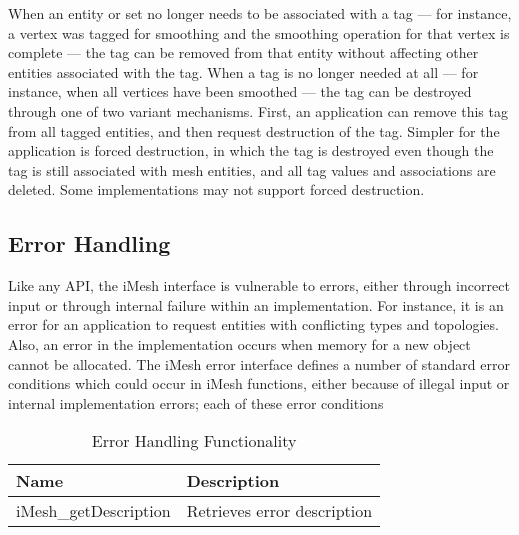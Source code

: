 When an entity or set no longer needs to be associated with a tag
--- for instance, a vertex was tagged for smoothing and the smoothing
operation for that vertex is complete --- the tag can be removed from
that entity without affecting other entities associated with the tag.
When a tag is no longer needed at all --- for instance, when all vertices
have been smoothed --- the tag can be destroyed through one of two
variant mechanisms. First, an application can remove this tag from
all tagged entities, and then request destruction of the tag. Simpler
for the application is forced destruction, in which the tag is destroyed
even though the tag is still associated with mesh entities, and all
tag values and associations are deleted. Some implementations may
not support forced destruction.


\subsection{Error Handling\label{sub:Error-Handling}}

Like any API, the iMesh interface is vulnerable to errors, either
through incorrect input or through internal failure within an implementation.
For instance, it is an error for an application to request entities
with conflicting types and topologies. Also, an error in the implementation
occurs when memory for a new object cannot be allocated. The iMesh
error interface defines a number of standard error conditions which
could occur in iMesh functions, either because of illegal input or
internal implementation errors; each of these error conditions

%
\begin{table}

\caption{Error Handling Functionality}

\label{table:Error} \begin{tabular}{|p{1.25in}|p{223pt}|}
\hline 
{\small Name}&
{\small Description}\tabularnewline
\hline
\hline 
{\small iMesh\_getDescription}&
{\small Retrieves error description}\tabularnewline
\hline
\end{tabular}
\end{table}
